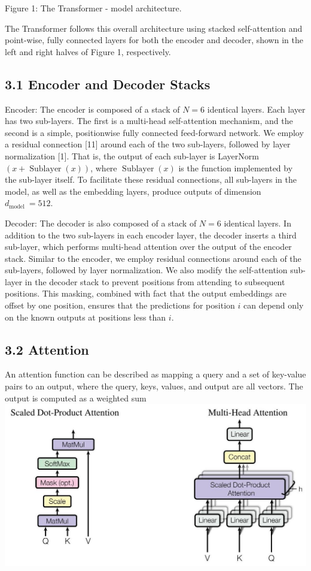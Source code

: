 \documentclass[10pt]{article}
\begin{document}
Figure 1: The Transformer - model architecture.

The Transformer follows this overall architecture using stacked self-attention and point-wise, fully connected layers for both the encoder and decoder, shown in the left and right halves of Figure 1, respectively.

\subsection*{3.1 Encoder and Decoder Stacks}
Encoder: The encoder is composed of a stack of $N=6$ identical layers. Each layer has two sub-layers. The first is a multi-head self-attention mechanism, and the second is a simple, positionwise fully connected feed-forward network. We employ a residual connection [11] around each of the two sub-layers, followed by layer normalization [1]. That is, the output of each sub-layer is LayerNorm $(x+\operatorname{Sublayer}(x))$, where $\operatorname{Sublayer}(x)$ is the function implemented by the sub-layer itself. To facilitate these residual connections, all sub-layers in the model, as well as the embedding layers, produce outputs of dimension $d_{\text {model }}=512$.

Decoder: The decoder is also composed of a stack of $N=6$ identical layers. In addition to the two sub-layers in each encoder layer, the decoder inserts a third sub-layer, which performs multi-head attention over the output of the encoder stack. Similar to the encoder, we employ residual connections around each of the sub-layers, followed by layer normalization. We also modify the self-attention sub-layer in the decoder stack to prevent positions from attending to subsequent positions. This masking, combined with fact that the output embeddings are offset by one position, ensures that the predictions for position $i$ can depend only on the known outputs at positions less than $i$.

\subsection*{3.2 Attention}
An attention function can be described as mapping a query and a set of key-value pairs to an output, where the query, keys, values, and output are all vectors. The output is computed as a weighted sum\\
\includegraphics[max width=\textwidth, center]{2024_11_26_e9e27627ef2b75478aaag-04}
\end{document}

